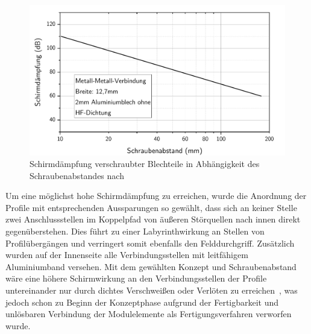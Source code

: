 \begin{figure}[ht]
    \centering
    \includegraphics[page = 1, trim = 0cm 0cm 0cm 0cm, clip, width=.65\textwidth]{Abbildungen/Kapitel3/Schraubenabstand_Schirmwirkung.pdf}
    \caption[Schirmdämpfung verschraubter Blechteile in Abhängigkeit des Schraubenabstandes]{Schirmdämpfung verschraubter Blechteile in Abhängigkeit des Schraubenabstandes nach~\cite{Design_of_shielded_enclosures}}
    \label{fig:3_Schirmwirkung_Schraubenabstand}
\end{figure}

\par
\vspace{\linespace}
Um eine möglichst hohe Schirmdämpfung zu erreichen, wurde die Anordnung der Profile mit entsprechenden Aussparungen so gewählt, dass sich an keiner Stelle zwei Anschlussstellen im Koppelpfad von äußeren Störquellen nach innen direkt gegenüberstehen. Dies führt zu einer Labyrinthwirkung an Stellen von Profilübergängen und verringert somit ebenfalls den Felddurchgriff. Zusätzlich wurden auf der Innenseite alle Verbindungsstellen mit leitfähigem Aluminiumband versehen. Mit dem gewählten Konzept und Schraubenabstand wäre eine höhere Schirmwirkung an den Verbindungsstellen der Profile untereinander nur durch dichtes Verschweißen oder Verlöten zu erreichen~\cite{Design_of_shielded_enclosures, EM_Schirmung}, was jedoch schon zu Beginn der Konzeptphase aufgrund der Fertigbarkeit und unlösbaren Verbindung der Modulelemente als Fertigungsverfahren verworfen wurde. 
\par
\vspace{\linespace}


    


